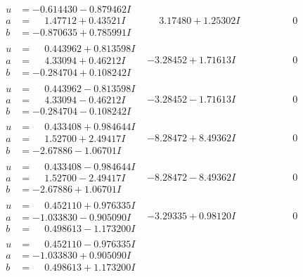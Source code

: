 \documentclass[1p]{elsarticle_modified}
\theoremstyle{definition}
\begin{document}
$$\begin{array}{c|c|c}
\begin{aligned}
u &= -0.614430 - 0.879462 I \\
a &= \phantom{-}1.47712 + 0.43521 I \\
b &= -0.870635 + 0.785991 I\end{aligned}
 & \phantom{-}3.17480 + 1.25302 I & \phantom{-0.000000 } 0 \\ \hline\begin{aligned}
u &= \phantom{-}0.443962 + 0.813598 I \\
a &= \phantom{-}4.33094 + 0.46212 I \\
b &= -0.284704 + 0.108242 I\end{aligned}
 & -3.28452 + 1.71613 I & \phantom{-0.000000 } 0 \\ \hline\begin{aligned}
u &= \phantom{-}0.443962 - 0.813598 I \\
a &= \phantom{-}4.33094 - 0.46212 I \\
b &= -0.284704 - 0.108242 I\end{aligned}
 & -3.28452 - 1.71613 I & \phantom{-0.000000 } 0 \\ \hline\begin{aligned}
u &= \phantom{-}0.433408 + 0.984644 I \\
a &= \phantom{-}1.52700 + 2.49417 I \\
b &= -2.67886 - 1.06701 I\end{aligned}
 & -8.28472 + 8.49362 I & \phantom{-0.000000 } 0 \\ \hline\begin{aligned}
u &= \phantom{-}0.433408 - 0.984644 I \\
a &= \phantom{-}1.52700 - 2.49417 I \\
b &= -2.67886 + 1.06701 I\end{aligned}
 & -8.28472 - 8.49362 I & \phantom{-0.000000 } 0 \\ \hline\begin{aligned}
u &= \phantom{-}0.452110 + 0.976335 I \\
a &= -1.033830 - 0.905090 I \\
b &= \phantom{-}0.498613 - 1.173200 I\end{aligned}
 & -3.29335 + 0.98120 I & \phantom{-0.000000 } 0 \\ \hline\begin{aligned}
u &= \phantom{-}0.452110 - 0.976335 I \\
a &= -1.033830 + 0.905090 I \\
b &= \phantom{-}0.498613 + 1.173200 I\end{aligned}

\end{array}$$
\end{document}

